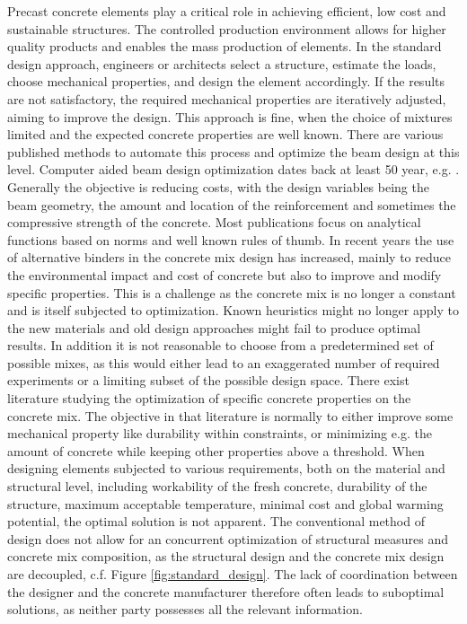Precast concrete elements play a critical role in achieving efficient, low cost and sustainable structures.
The controlled production environment allows for higher quality products and enables the mass production of elements.
In the standard design approach, engineers or architects select a structure, estimate the loads, choose mechanical properties, and design the element accordingly. 
If the results are not satisfactory, the required mechanical properties are iteratively adjusted, aiming to improve the design.
This approach is fine, when the choice of mixtures limited and the expected concrete properties are well known.
There are various published methods to automate this process and optimize the beam design at this level.
Computer aided beam design optimization dates back  at least 50 year, e.g. \cite{Haung1967}.
Generally the objective is reducing costs, with the design variables being the beam geometry, the amount and location of the reinforcement and sometimes the compressive strength of the concrete.
Most publications focus on analytical functions based on norms and well known rules of thumb.
In recent years the use of alternative binders in the concrete mix design has increased, mainly to reduce the environmental impact and cost of concrete but also to improve and modify specific properties.
This is a challenge as the concrete mix is no longer a constant and is itself subjected to optimization.
Known heuristics might no longer apply to the new materials and old design approaches might fail to produce optimal results.
In addition it is not reasonable to choose from a predetermined set of possible mixes, as this would either lead to an exaggerated number of required experiments or a limiting subset of the possible design space.
There exist literature studying the optimization of specific concrete properties on the concrete mix.
The objective in that literature is normally to either improve some mechanical property like durability within constraints, or minimizing e.g. the amount of concrete while keeping other properties above a threshold.
When designing elements subjected to various requirements, both on the material and structural level, including workability of the fresh concrete, durability of the structure, maximum acceptable temperature, minimal cost and global warming potential, the optimal solution is not apparent.
The conventional method of design does not allow for an concurrent optimization of structural measures and concrete mix composition, as the structural  design and the concrete mix design are decoupled, c.f. Figure \ref{fig:standard_design}.
The lack of coordination between the designer and the concrete manufacturer therefore often leads to suboptimal solutions, as neither party possesses all the relevant information.

